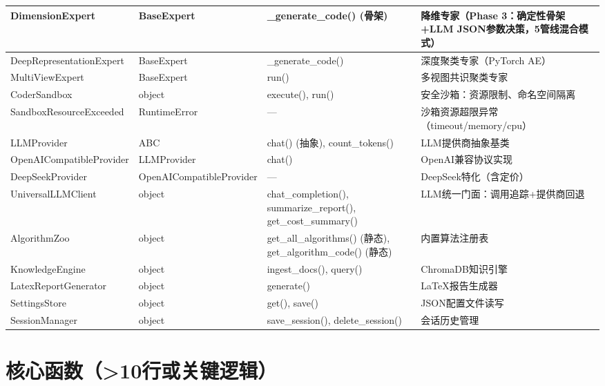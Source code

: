\documentclass[11pt,a4paper]{ctexbook}
\begin{document}
\begin{longtable}{p{2.8cm} p{2cm} p{2.5cm} p{5.5cm}}
    \midrule
    DimensionExpert & BaseExpert & \_generate\_code() (骨架) & 降维专家（Phase 3：确定性骨架+LLM JSON参数决策，5管线混合模式）\\
    \midrule
    DeepRepresentationExpert & BaseExpert & \_generate\_code() & 深度聚类专家（PyTorch AE） \\
    \midrule
    MultiViewExpert & BaseExpert & run() & 多视图共识聚类专家 \\
    \midrule
    CoderSandbox & object & execute(), run() & 安全沙箱：资源限制、命名空间隔离 \\
    \midrule
    SandboxResourceExceeded & RuntimeError & — & 沙箱资源超限异常（timeout/memory/cpu） \\
    \midrule
    LLMProvider & ABC & chat() (抽象), count\_tokens() & LLM提供商抽象基类 \\
    \midrule
    OpenAICompatibleProvider & LLMProvider & chat() & OpenAI兼容协议实现 \\
    \midrule
    DeepSeekProvider & OpenAICompatibleProvider & — & DeepSeek特化（含定价） \\
    \midrule
    UniversalLLMClient & object & chat\_completion(), summarize\_report(), get\_cost\_summary() & LLM统一门面：调用追踪+提供商回退 \\
    \midrule
    AlgorithmZoo & object & get\_all\_algorithms() (静态), get\_algorithm\_code() (静态) & 内置算法注册表 \\
    \midrule
    KnowledgeEngine & object & ingest\_docs(), query() & ChromaDB知识引擎 \\
    \midrule
    LatexReportGenerator & object & generate() & LaTeX报告生成器 \\
    \midrule
    SettingsStore & object & get(), save() & JSON配置文件读写 \\
    \midrule
    SessionManager & object & save\_session(), delete\_session() & 会话历史管理 \\
    \bottomrule
\end{longtable}

\section{核心函数（>10行或关键逻辑）}
\end{document}
